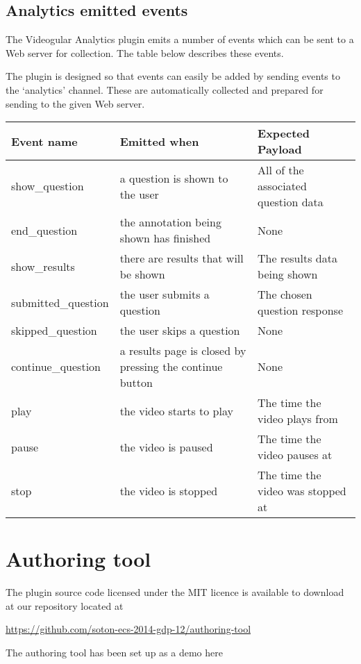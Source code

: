 \documentclass[12pt,a4paper]{article}
\begin{document}
\subsection{Analytics emitted events}

The Videogular Analytics plugin emits a number of events which can be sent to a Web server for collection. The table below describes these events.

The plugin is designed so that events can easily be added by sending events to the `analytics' channel. These are automatically collected and prepared for sending to the given Web server.

\begin{tabular}{p{3.2cm} p{7cm} p{4cm}}

\textbf{Event name} & \textbf{Emitted when} & \textbf{Expected Payload} \\ 
\hline 
show\_question & a question is shown to the user & All of the associated question data \\ 
\hline 
end\_question & the annotation being shown has finished & None \\ 
\hline 
show\_results & there are results that will be shown & The results data being shown \\ 
\hline 
submitted\_question & the user submits a question & The chosen question response \\ 
\hline 
skipped\_question & the user skips a question & None \\ 
\hline 
continue\_question & a results page is closed by pressing the continue button & None \\ 
\hline 
play & the video starts to play & The time the video plays from \\ 
\hline 
pause & the video is paused & The time the video pauses at \\ 
\hline 
stop & the video is stopped & The time the video was stopped at \\
\end{tabular} 


\section{Authoring tool}

The plugin source code licensed under the MIT licence is available to download at our repository located at 

\url{https://github.com/soton-ecs-2014-gdp-12/authoring-tool}

The authoring tool has been set up as a demo here
\end{document}
